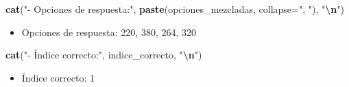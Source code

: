 \documentclass[
]{article}
\newenvironment{Shaded}{\begin{snugshade}}{\end{snugshade}}
\newcommand{\AttributeTok}[1]{\textcolor[rgb]{0.13,0.29,0.53}{#1}}
\newcommand{\FunctionTok}[1]{\textcolor[rgb]{0.13,0.29,0.53}{\textbf{#1}}}
\newcommand{\NormalTok}[1]{#1}
\newcommand{\SpecialCharTok}[1]{\textcolor[rgb]{0.81,0.36,0.00}{\textbf{#1}}}
\newcommand{\StringTok}[1]{\textcolor[rgb]{0.31,0.60,0.02}{#1}}
\providecommand{\tightlist}{%
  \setlength{\itemsep}{0pt}\setlength{\parskip}{0pt}}
\begin{document}
\begin{Shaded}
\begin{Highlighting}[]
\FunctionTok{cat}\NormalTok{(}\StringTok{"{-} Opciones de respuesta:"}\NormalTok{, }\FunctionTok{paste}\NormalTok{(opciones\_mezcladas, }\AttributeTok{collapse=}\StringTok{", "}\NormalTok{), }\StringTok{"}\SpecialCharTok{\textbackslash{}n}\StringTok{"}\NormalTok{)}
\end{Highlighting}
\end{Shaded}

\begin{itemize}
\tightlist
\item
  Opciones de respuesta: 220, 380, 264, 320
\end{itemize}

\begin{Shaded}
\begin{Highlighting}[]
\FunctionTok{cat}\NormalTok{(}\StringTok{"{-} Índice correcto:"}\NormalTok{, indice\_correcto, }\StringTok{"}\SpecialCharTok{\textbackslash{}n}\StringTok{"}\NormalTok{)}
\end{Highlighting}
\end{Shaded}

\begin{itemize}
\tightlist
\item
  Índice correcto: 1
\end{itemize}
\end{document}
